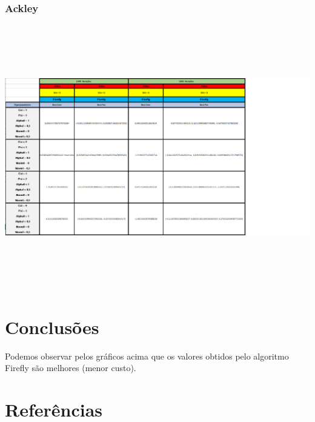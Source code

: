 \documentclass[10pt]{article}
\begin{document}
\subsubsection{Ackley}\label{sec:comp-PSO}
  \includegraphics[height=11.5cm]{img/Fireflyackley.png}

\section{Conclusões}\label{sec:an-da-info-fin-da-org}
  Podemos observar pelos gráficos acima que os valores obtidos pelo algoritmo Firefly são melhores (menor custo).

\vspace{1cm}

\section{Referências}\label{sec:sup-inf-utl}


\nocite{FirePso}



\pagebreak
\end{document}
